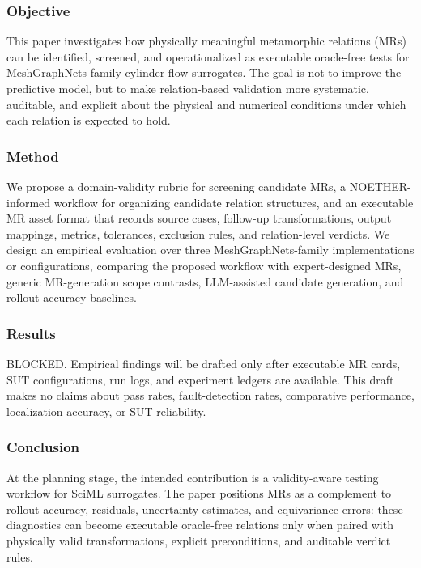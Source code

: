 \subsubsection{Objective}\label{objective}

This paper investigates how physically meaningful metamorphic relations
(MRs) can be identified, screened, and operationalized as executable
oracle-free tests for MeshGraphNets-family cylinder-flow surrogates. The
goal is not to improve the predictive model, but to make relation-based
validation more systematic, auditable, and explicit about the physical
and numerical conditions under which each relation is expected to hold.

\subsubsection{Method}\label{method}

We propose a domain-validity rubric for screening candidate MRs, a
NOETHER-informed workflow for organizing candidate relation structures,
and an executable MR asset format that records source cases, follow-up
transformations, output mappings, metrics, tolerances, exclusion rules,
and relation-level verdicts. We design an empirical evaluation over
three MeshGraphNets-family implementations or configurations, comparing
the proposed workflow with expert-designed MRs, generic MR-generation
scope contrasts, LLM-assisted candidate generation, and rollout-accuracy
baselines.

\subsubsection{Results}\label{results}

BLOCKED. Empirical findings will be drafted only after executable MR
cards, SUT configurations, run logs, and experiment ledgers are
available. This draft makes no claims about pass rates, fault-detection
rates, comparative performance, localization accuracy, or SUT
reliability.

\subsubsection{Conclusion}\label{conclusion}

At the planning stage, the intended contribution is a validity-aware
testing workflow for SciML surrogates. The paper positions MRs as a
complement to rollout accuracy, residuals, uncertainty estimates, and
equivariance errors: these diagnostics can become executable oracle-free
relations only when paired with physically valid transformations,
explicit preconditions, and auditable verdict rules.

